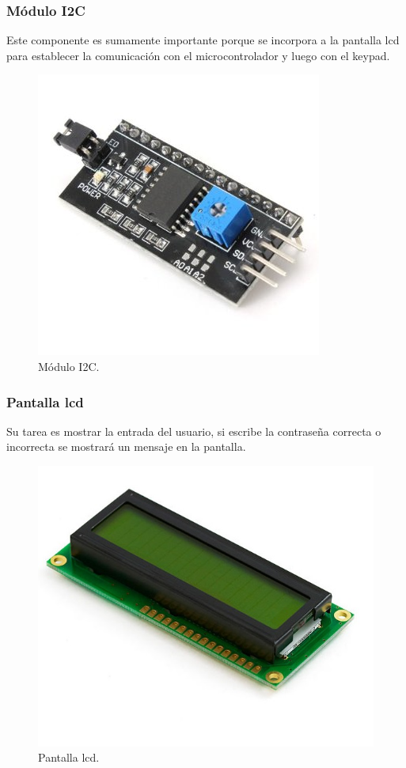 \subsubsection*{Módulo I2C}
Este componente es sumamente importante porque se incorpora a la pantalla lcd para establecer la comunicación con el microcontrolador y luego con el keypad.
\begin{figure}[H]
    \centering
    \includegraphics[width=.4\linewidth]{Img/i2c.jpg}
    \caption{Módulo I2C.}
    \label{fig_i2c}
\end{figure}
\subsubsection*{Pantalla lcd}
Su tarea es mostrar la entrada del usuario, si escribe la contraseña correcta o incorrecta se mostrará un mensaje en la pantalla.
\begin{figure}[H]
    \centering
    \includegraphics[width=.4\linewidth]{Img/lcd.jpg}
    \caption{Pantalla lcd.}
    \label{fig_lcd}
\end{figure}
